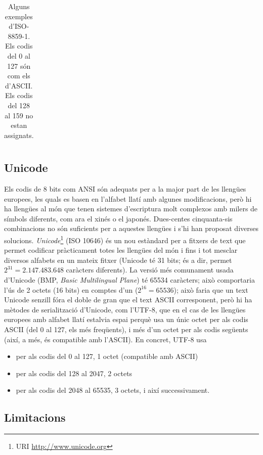 \begin{table}
\begin{center}
\begin{tabular}{c|l|l}
\end{tabular}
\end{center}
\caption{Alguns exemples d'ISO-8859-1. Els codis del 0 al 127 són com
  els d'ASCII. Els codis del 128 al 159 no estan assignats.}
\label{tb:ISO88591}
\end{table}

\subsection{Unicode}

Els codis de 8 bits com ANSI són adequats per a la major part de les
llengües europees, les quals es basen en l'alfabet llatí amb algunes
modificacions, però hi ha llengües al món que tenen sistemes
d'escriptura molt complexos amb milers de símbols diferents, com ara
el xinés o el japonés. Dues-centes cinquanta-sis combinacions no són
suficients per a aquestes llengües i s'hi han proposat diverses
solucions.  \emph{Unicode}\footnote{URI \url{http://www.unicode.org}}
(ISO 10646) és un nou estàndard per a fitxers de text que permet
codificar pràcticament totes les llengües del món i fins i tot mesclar
diversos alfabets en un mateix fitxer (Unicode té 31 bits; és a dir,
permet $2^{31}=2.147.483.648$ caràcters diferents). La versió més
comunament usada d'Unicode (BMP, \emph{Basic Multilingual Plane}) té
65534 caràcters; això comportaria l'ús de 2 octets (16 bits) en
comptes d'un ($2^{16}=65536$); això faria que un text Unicode senzill
fóra el doble de gran que el text ASCII corresponent, però hi ha
mètodes de serialització d'Unicode, com l'UTF-8, que en el cas de les
llengües europees amb alfabet llatí estalvia espai perquè usa un únic
octet per als codis ASCII (del 0 al 127, els més freqüents), i més
d'un octet per als codis següents (així, a més, és compatible amb
l'ASCII). En concret, UTF-8 usa
\begin{itemize}
\item per als codis del 0 al 127, 1 octet (compatible amb  ASCII)
\item per als codis del 128 al 2047, 2 octets
\item per als codis del 2048 al 65535, 3 octets, i així successivament.
\end{itemize}

\subsection{Limitacions}

